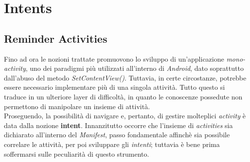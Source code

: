 \documentclass{article}
\begin{document}
\pagestyle{empty}

\section*{Intents}
\large

\subsection*{Reminder Activities}
Fino ad ora le nozioni trattate promuovono lo sviluppo di un'applicazione \textit{mono-activity}, uno dei paradigmi più utilizzati all'interno di \textit{Android}, dato soprattutto dall'abuso del metodo \textit{SetContentView()}. Tuttavia, in certe circostanze, potrebbe essere necessario implementare più di una singola attività. Tutto questo si traduce in un ulteriore layer di difficoltà, in quanto le conoscenze possedute non permettono di manipolare un insieme di attività.\vspace*{7pt}\\
Proseguendo, la possibilità di navigare e, pertanto, di gestire molteplici \textit{activity} è data dalla nozione \textbf{intent}. Innanzitutto occorre che l'insieme di \textit{activities} sia dichiarato all'interno del \textit{Manifest}, passo fondamentale affinchè sia possibile correlare le attività, per poi sviluppare gli \textit{intenti}; tuttavia è bene prima soffermarsi sulle peculiarità di questo strumento.
\end{document}
